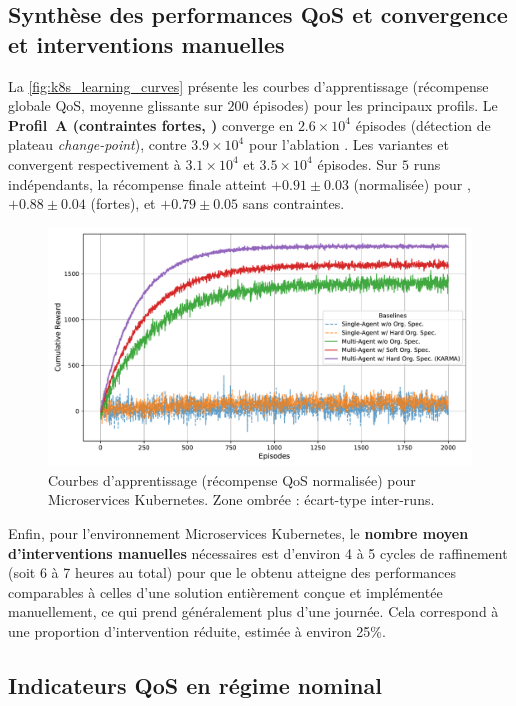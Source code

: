 \subsection*{Synthèse des performances QoS et convergence et interventions manuelles}

La \autoref{fig:k8s_learning_curves} présente les courbes d'apprentissage (récompense globale QoS, moyenne glissante sur $200$ épisodes) pour les principaux profils.
Le \textbf{Profil~A (contraintes fortes, )} converge en $2.6\times 10^4$ épisodes (détection de plateau \emph{change-point}), contre $3.9\times 10^4$ pour l'ablation .
Les variantes  et  convergent respectivement à $3.1\times 10^4$ et $3.5\times 10^4$ épisodes.
Sur $5$ runs indépendants, la récompense finale atteint $+0.91 \pm 0.03$ (normalisée) pour , $+0.88 \pm 0.04$ (fortes), et $+0.79 \pm 0.05$ sans contraintes.

\begin{figure}[h!]
  \centering
  \includegraphics[width=0.75\linewidth]{figures/results_k8s_learning.pdf}
  \caption[Courbes d'apprentissage (récompense QoS normalisée) pourMicroservices Kubernetes]{Courbes d'apprentissage (récompense QoS normalisée) pour Microservices Kubernetes. Zone ombrée : écart-type inter-runs.}
  \label{fig:k8s_learning_curves}
\end{figure}

Enfin, pour l'environnement Microservices Kubernetes, le \textbf{nombre moyen d'interventions manuelles} nécessaires est d'environ 4 à 5 cycles de raffinement (soit 6 à 7 heures au total) pour que le  obtenu atteigne des performances comparables à celles d'une solution entièrement conçue et implémentée manuellement, ce qui prend généralement plus d'une journée. Cela correspond à une proportion d'intervention réduite, estimée à environ 25\%.

\subsection*{Indicateurs QoS en régime nominal}

